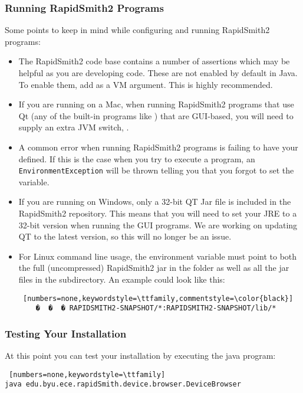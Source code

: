 \subsubsection{Running RapidSmith2 Programs}
Some points to keep in mind while configuring and running RapidSmith2 programs:
\begin{itemize}
  \item The RapidSmith2 code base contains a number of assertions which may be helpful  
  as you are developing code.  These are not enabled by default in Java.  To
  enable them, add  as a VM argument.  This is highly recommended.
  \item If you are running on a Mac, when running RapidSmith2 programs that use Qt  (any
  of the built-in programs like ) that are GUI-based, you
  will need to supply an extra JVM switch, .
  \item A common error when running RapidSmith2 programs is failing to have your
   defined.  If this is the case when you try to execute a
  program, an \texttt{EnvironmentException} will be thrown telling you that you
  forgot to set the variable.
  \item If you are running on Windows, only a 32-bit QT Jar file is included in
  the RapidSmith2 repository. This means that you will need to set your JRE to a 32-bit
  version when running the GUI programs. We are working on updating QT to the
  latest version, so this will no longer be an issue.
  \item For Linux command line usage, the  environment variable
  must point to both the full (uncompressed) RapidSmith2 jar in the 
  folder as well as all the jar files in the  subdirectory. An example
   could look like this:
\begin{lstlisting} [numbers=none,keywordstyle=\ttfamily,commentstyle=\color{black}] 
	�  �  � RAPIDSMITH2-SNAPSHOT/*:RAPIDSMITH2-SNAPSHOT/lib/*
\end{lstlisting}
\end{itemize}

\subsubsection{Testing Your Installation}
\noindent At this point you can test your installation by executing the java
 program: 

\begin{lstlisting} [numbers=none,keywordstyle=\ttfamily]
java edu.byu.ece.rapidSmith.device.browser.DeviceBrowser
\end{lstlisting} 

